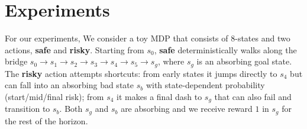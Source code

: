 \documentclass[final,12pt]{colt2026} %
\begin{document}
\section{Experiments}\label{app:experiments}
For our experiments, We consider a toy MDP  that consists of 8-states and two actions, \textbf{safe} and \textbf{risky}. Starting from $s_0$, \textbf{safe} deterministically walks along the bridge $s_0 \to s_1 \to s_2 \to s_3 \to s_4 \to s_5 \to s_g$, where $s_g$ is an absorbing goal state. The \textbf{risky} action attempts shortcuts: from early states it jumps directly to $s_4$ but can fall into an absorbing bad state $s_b$ with state-dependent probability (start/mid/final risk); from $s_4$ it makes a final dash to $s_g$ that can also fail and transition to $s_b$. Both $s_g$ and $s_b$ are absorbing and we receive reward $1$ in $s_g$ for the rest of the horizon. 
\end{document}
